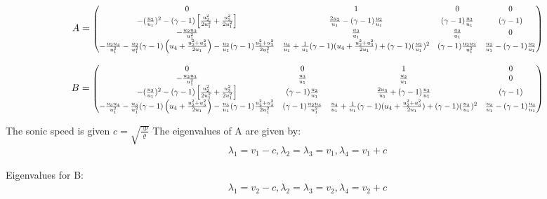 \documentclass[11pt]{scrartcl}
\newcommand\scalemath[2]{\scalebox{#1}{\mbox{\ensuremath{\displaystyle #2}}}}
\begin{document}
\begin{align*}
	A=
	\scalemath{0.8}{
		\begin{pmatrix}
			0 & 1 & 0 & 0\\
			-(\frac{u_2}{u_1})^2- (\gamma -1) \left[\frac{u_2^2}{2 u_1^2}+\frac{u_3^2}{2 u_1^2}\right]    & \frac{2 u_2}{u_1} - (\gamma - 1)\frac{u_2}{u_1} &  (\gamma - 1) \frac{u_3}{u_1} & (\gamma - 1) \\
			-\frac{u_2 u_3}{u_1^2} & \frac{u_3}{u_1} & \frac{u_2}{u_1} & 0 \\
			-\frac{u_2 u_4}{u_1^2}-\frac{u_2}{u_1^2}(\gamma -1) \left(u_4+\frac{u_2^2+u_3^2}{2u_1}\right) - \frac{u_2}{u_1}(\gamma - 1) \frac{u_2^2+u_3^2}{2u_1^2} & 
			\frac{u_4}{u_1}+\frac{1}{u_1}(\gamma - 1) (u_4+ \frac{u_2^2+ u_3^2}{2 u_1}) + (\gamma - 1) (\frac{u_2}{u_1})^2
			& (\gamma - 1) \frac{u_2 u_3}{u_1^2} & \frac{u_2}{u_1} - (\gamma - 1) \frac{u_2}{u_1} 
	\end{pmatrix} }
\end{align*}

\begin{align*}
	B =
	\scalemath{0.8}{
		\begin{pmatrix}
			0 & 0 & 1 & 0\\
			-\frac{u_2 u_3}{u_1^2}  & \frac{u_3}{u_1} &   \frac{u_2}{u_1} & 0\\
			-(\frac{u_3}{u_1})^2- (\gamma -1) \left[\frac{u_2^2}{2 u_1^2}+\frac{u_3^2}{2 u_1^2}\right]  & (\gamma - 1 ) \frac{u_2}{u_1}& \frac{2 u_3}{u_1} + (\gamma - 1)\frac{u_3}{u_1} & ( \gamma - 1) \\
			-\frac{u_3  u_4}{u_1^2}-\frac{u_3}{u_1^2}(\gamma -1) \left(u_4+\frac{u_2^2+u_3^2}{2u_1}\right) - \frac{u_3}{u_1}(\gamma - 1) \frac{u_2^2+u_3^2}{2u_1^2} &  (\gamma - 1) \frac{u_2 u_3}{u_1^2}
			& \frac{u_4}{u_1}+\frac{1}{u_1}(\gamma - 1) (u_4+ \frac{u_2^2+ u_3^2}{2 u_1}) + (\gamma - 1) (\frac{u_3}{u_1})^2  & \frac{u_3}{u_1} - (\gamma - 1) \frac{u_3}{u_1} 
	\end{pmatrix} }
\end{align*}

The sonic speed is given $c=\sqrt{\frac{\gamma p}{\varrho}}$
The eigenvalues of A are given by:
\begin{align*}
	\lambda_1=v_1 - c ,\lambda_2 = \lambda_3 = v_1 , \lambda_4 = v_1 + c
\end{align*}

Eigenvalues for B:
\begin{align*}
	\lambda_1=v_2- c ,\lambda_2 = \lambda_3 = v_2 , \lambda_4 = v_2 + c
\end{align*}
\end{document}
